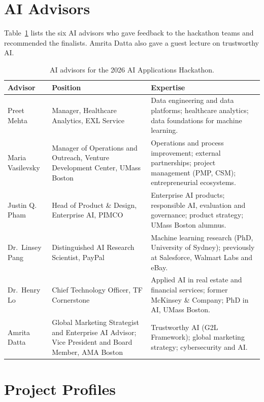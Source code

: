 \documentclass[sigconf,nonacm]{acmart}
\begin{document}
\section{AI Advisors}
\label{app:advisors}
Table~\ref{tab:advisors} lists the six AI advisors who gave feedback to the hackathon teams and recommended the finalists. Amrita Datta also gave a guest lecture on trustworthy AI.
\begin{table}[htbp]
  \centering
  \caption{AI advisors for the 2026 AI Applications Hackathon.}
  \label{tab:advisors}
  \small
  \begin{tabularx}{\textwidth}{@{}p{3.2cm}p{5.0cm}X@{}}
    \toprule
    \textbf{Advisor} & \textbf{Position} & \textbf{Expertise} \\
    \midrule
    Preet Mehta & Manager, Healthcare Analytics, EXL Service & Data engineering and data platforms; healthcare analytics; data foundations for machine learning. \\
    Maria Vasilevsky & Manager of Operations and Outreach, Venture Development Center, UMass Boston & Operations and process improvement; external partnerships; project management (PMP, CSM); entrepreneurial ecosystems. \\
    Justin Q. Pham & Head of Product \& Design, Enterprise AI, PIMCO & Enterprise AI products; responsible AI, evaluation and governance; product strategy; UMass Boston alumnus. \\
    Dr.\ Linsey Pang & Distinguished AI Research Scientist, PayPal & Machine learning research (PhD, University of Sydney); previously at Salesforce, Walmart Labs and eBay. \\
    Dr.\ Henry Lo & Chief Technology Officer, TF Cornerstone & Applied AI in real estate and financial services; former McKinsey \& Company; PhD in AI, UMass Boston. \\
    Amrita Datta & Global Marketing Strategist and Enterprise AI Advisor; Vice President and Board Member, AMA Boston & Trustworthy AI (G2L Framework); global marketing strategy; cybersecurity and AI. \\
    \bottomrule
  \end{tabularx}
\end{table}

\clearpage
\section{Project Profiles}
\label{app:profiles}
\begingroup
\setlength{\parindent}{0pt}
\setlength{\parskip}{5pt}
\renewcommand{\arraystretch}{1.15}
\end{document}

